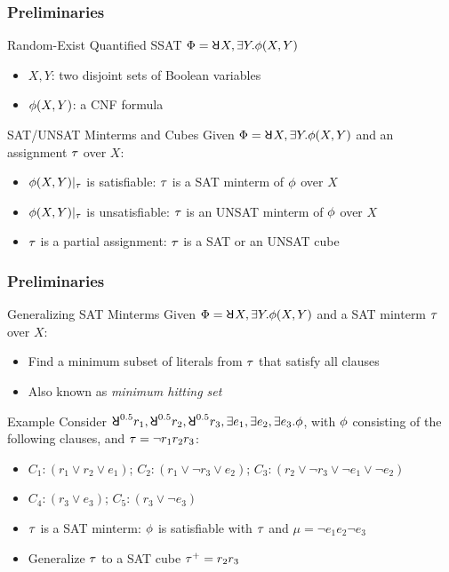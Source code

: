 \begin{frame}
  \frametitle{Preliminaries}
  \begin{block}{Random-Exist Quantified SSAT}
    $\Qf=\random{} X,\exists Y.\pf(X,Y)$
    \pause
    \begin{itemize}
      \item $X,Y$: two disjoint sets of Boolean variables
            \pause
      \item $\phi(X,Y)$: a CNF formula
            \pause
    \end{itemize}
  \end{block}
  \begin{block}{SAT/UNSAT Minterms and Cubes}
    Given $\Qf=\random{} X,\exists Y.\pf(X,Y)$ and an assignment $\tau$ over $X$:
    \pause
    \begin{itemize}
      \item $\phi(X,Y)|_{\tau}$ is satisfiable: $\tau$ is a SAT minterm of $\phi$ over $X$
            \pause
      \item $\phi(X,Y)|_{\tau}$ is unsatisfiable: $\tau$ is an UNSAT minterm of $\phi$ over $X$
            \pause
      \item $\tau$ is a partial assignment: $\tau$ is a SAT or an UNSAT cube
    \end{itemize}
  \end{block}
\end{frame}

\begin{frame}
  \frametitle{Preliminaries}
  \begin{block}{Generalizing SAT Minterms}
    Given $\Qf=\random{} X,\exists Y.\pf(X,Y)$ and a SAT minterm $\tau$ over $X$:
    \pause
    \begin{itemize}
      \item Find a minimum subset of literals from $\tau$ that satisfy all clauses
            \pause
      \item Also known as \textit{minimum hitting set}
            \pause
    \end{itemize}
  \end{block}
  \begin{block}{Example}
    Consider $\random{0.5}r_1,\random{0.5}r_2,\random{0.5}r_3,\exists e_1,\exists e_2,\exists e_3.\pf$,
    with $\phi$ consisting of the following clauses, and $\tau=\lnot r_1r_2r_3$:
    \begin{itemize}
      \item[] $C_1: (r_1 \lor r_2 \lor e_1)$; $C_2: (r_1 \lor \lnot r_3 \lor e_2)$; $C_3: (r_2 \lor \lnot r_3 \lor \lnot e_1 \lor \lnot e_2)$
      \item[] $C_4: (r_3 \lor e_3)$; $C_5: (r_3 \lor \lnot e_3)$
            \pause
    \end{itemize}
    \begin{itemize}
      \item $\tau$ is a SAT minterm: $\phi$ is satisfiable with $\tau$ and $\mu=\lnot e_1e_2\lnot e_3$
            \pause
      \item Generalize $\tau$ to a SAT cube $\tau^+=r_2r_3$
    \end{itemize}
  \end{block}
\end{frame}

